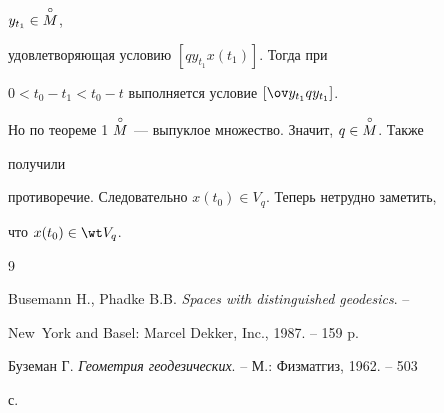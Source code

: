 $y_{t_1}\in\overset{\circ}{M}{}$, 


удовлетворяющая условию $[q y_{t_1}x(t_1)]$. Тогда при 


$0<t_0-t_1<t_0-t$ выполняется условие $[\ov y_{t_1}q y_{t_1}]$. 


Но по теореме 1\; $\overset{\circ}{M}{}$ --- выпуклое множество. Значит, $q\in\overset{\circ}{M}{}$. Также 


получили 


противоречие. Следовательно $x(t_0)\in V_q$. Теперь нетрудно заметить, 


что $x(t_0)\in\wt V_q$. 


 


\begin{thebibliography}{9} 


 




Busemann H., Phadke B.B. {\em Spaces with distinguished geodesics}. -- 


New~York and Basel: Marcel Dekker, Inc., 1987. -- 159 p. 




Буземан Г. {\em Геометрия геодезических}. -- М.: Физматгиз, 1962. -- 503 


с. 


 


 


\end{thebibliography} 


 


\vskip 2cm 


 






 


\label{end} 


 


